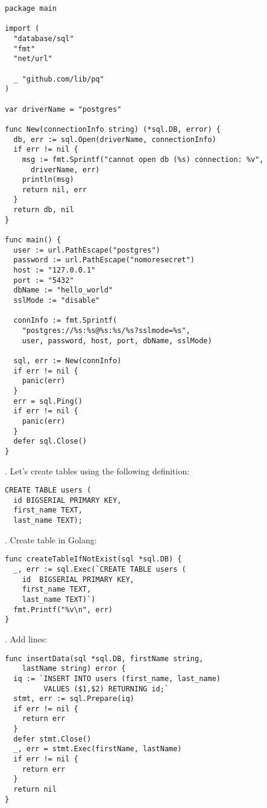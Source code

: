 \documentclass[11pt, letterpaper]{article}
\begin{document}
\begin{verbatim}
package main

import (
  "database/sql"
  "fmt"
  "net/url"

  _ "github.com/lib/pq"
)

var driverName = "postgres"

func New(connectionInfo string) (*sql.DB, error) {
  db, err := sql.Open(driverName, connectionInfo)
  if err != nil {
    msg := fmt.Sprintf("cannot open db (%s) connection: %v", 
      driverName, err)
    println(msg)
    return nil, err
  }
  return db, nil
}

func main() {
  user := url.PathEscape("postgres")
  password := url.PathEscape("nomoresecret")
  host := "127.0.0.1"
  port := "5432"
  dbName := "hello_world"
  sslMode := "disable"

  connInfo := fmt.Sprintf(
    "postgres://%s:%s@%s:%s/%s?sslmode=%s",
    user, password, host, port, dbName, sslMode)

  sql, err := New(connInfo)
  if err != nil {
    panic(err)
  }
  err = sql.Ping()
  if err != nil {
    panic(err)
  }
  defer sql.Close()
}
\end{verbatim}

. Let's create tables using the following definition:

\begin{verbatim}
CREATE TABLE users (
  id BIGSERIAL PRIMARY KEY,
  first_name TEXT,
  last_name TEXT);
\end{verbatim}

. Create table in Golang:

\begin{verbatim}
func createTableIfNotExist(sql *sql.DB) {
  _, err := sql.Exec(`CREATE TABLE users (
    id  BIGSERIAL PRIMARY KEY,
    first_name TEXT,
    last_name TEXT)`)
  fmt.Printf("%v\n", err)
}
\end{verbatim}

. Add lines:

\begin{verbatim}
func insertData(sql *sql.DB, firstName string,
    lastName string) error {
  iq := `INSERT INTO users (first_name, last_name)
         VALUES ($1,$2) RETURNING id;`
  stmt, err := sql.Prepare(iq)
  if err != nil {
    return err
  }
  defer stmt.Close()
  _, err = stmt.Exec(firstName, lastName)
  if err != nil {
    return err
  }
  return nil
}
\end{verbatim}
\end{document}
